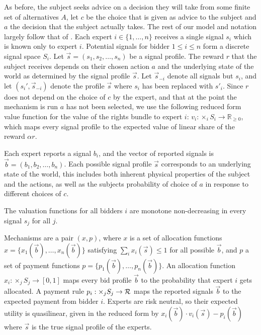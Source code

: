 As before, the subject seeks advice on a decision they will take from some finite set of alternatives $A$, let $c$ be the choice that is given as advice to the subject and $a$ the decision that the subject actually takes.
The rest of our model and notation largely follow that of \cite{eden2018interdependent}.%
Each expert $i \in \{1, \ldots, n\}$ receives a single signal $s_i$ which is known only to expert $i$.
Potential signals for bidder $1 \leq i\leq n$ form a discrete signal space $S_i$.
Let $\vec{s}=(s_1,s_2,\ldots,s_n)$ be a signal profile.
The reward $r$ that the subject receives depends on their chosen action $a$ and the underlying state of the world as determined by the signal profile $\vec{s}$.
Let $\vec{s}_{-i}$ denote all signals but $s_i$, and let $(s_i',\vec{s}_{-i})$ denote the profile $\vec{s}$ where $s_i$ has been replaced with $s'_i$. 
Since $r$ does not depend on the choice of $c$ by the expert, and that at the point the mechanism is run $a$ has not been selected, we use the following reduced form  value function for the value of the rights bundle to expert $i$: $v_i: \times_i S_i \rightarrow \mathbb{R}_{\geq 0}$, which maps every signal profile to the expected value of linear share of the reward  $\alpha r$.


Each expert reports a signal $b_i$, and the vector of reported signals is $\vec{b}=( b_1, b_2, \ldots, b_n)$.
Each possible signal profile $\vec{s}$ corresponds to an underlying state of the world, this includes both inherent physical properties of the subject and the actions, as well as the subjects probability of choice of $a$ in response to different choices of $c$.


The valuation functions for all bidders $i$ are monotone non-decreasing in every signal $s_j$ for all $j$.%

Mechanisms are a pair $(x,p)$, where $x$ is a set of allocation functions $x=\{x_1(\vec{b}),\ldots,x_n(\vec{b})\}$ satisfying $\sum_i x_i(\vec{s}) \leq 1$ for all possible $\vec{b}$, and $p$ a set of payment functions  $p=\{p_1(\vec{b}),\ldots,p_n(\vec{b})\}$.
An allocation function $x_i:\times_j S_j\rightarrow [0,1]$ maps every bid profile $\vec{b}$ to the probability that expert $i$ gets allocated.
A payment rule $p_i: \times _j S_j \rightarrow {\mathcal R}$ maps the reported signals $\vec{b}$ to the expected payment from bidder $i$. Experts are risk neutral, so their expected utility is quasilinear, given in the reduced form by $x_i (\vec{b}) \cdot v_i(\vec{s}) - p_i(\vec{b})$ where $\vec{s}$ is the true signal profile of the experts.


